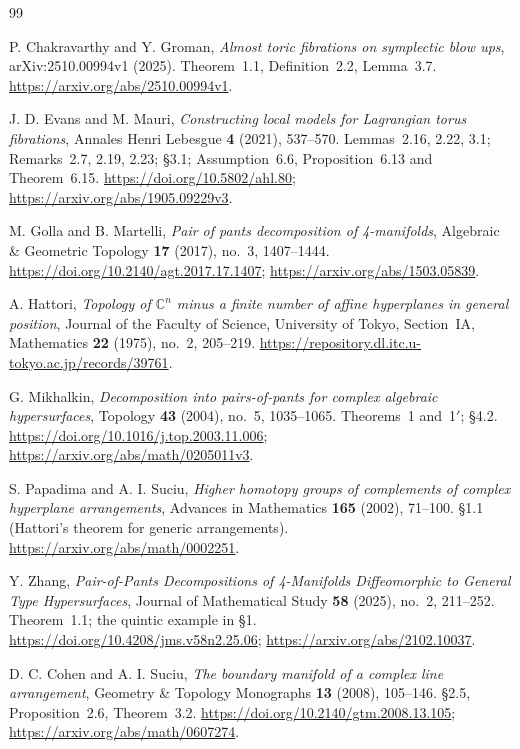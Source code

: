 \begin{thebibliography}{99}

P. Chakravarthy and Y. Groman,
\emph{Almost toric fibrations on symplectic blow ups},
arXiv:2510.00994v1 (2025).
Theorem~1.1, Definition~2.2, Lemma~3.7.
\url{https://arxiv.org/abs/2510.00994v1}.

J. D. Evans and M. Mauri,
\emph{Constructing local models for Lagrangian torus fibrations},
Annales Henri Lebesgue \textbf{4} (2021), 537--570.
Lemmas~2.16, 2.22, 3.1; Remarks~2.7, 2.19, 2.23; \S3.1;
Assumption~6.6, Proposition~6.13 and Theorem~6.15.
\url{https://doi.org/10.5802/ahl.80};
\url{https://arxiv.org/abs/1905.09229v3}.

M. Golla and B. Martelli,
\emph{Pair of pants decomposition of 4-manifolds},
Algebraic \& Geometric Topology \textbf{17} (2017), no.~3, 1407--1444.
\url{https://doi.org/10.2140/agt.2017.17.1407};
\url{https://arxiv.org/abs/1503.05839}.

A. Hattori,
\emph{Topology of $\mathbb C^n$ minus a finite number of affine hyperplanes in general position},
Journal of the Faculty of Science, University of Tokyo, Section~IA, Mathematics
\textbf{22} (1975), no.~2, 205--219.
\url{https://repository.dl.itc.u-tokyo.ac.jp/records/39761}.

G. Mikhalkin,
\emph{Decomposition into pairs-of-pants for complex algebraic hypersurfaces},
Topology \textbf{43} (2004), no.~5, 1035--1065.
Theorems~1 and~1$'$; \S4.2.
\url{https://doi.org/10.1016/j.top.2003.11.006};
\url{https://arxiv.org/abs/math/0205011v3}.

S. Papadima and A. I. Suciu,
\emph{Higher homotopy groups of complements of complex hyperplane arrangements},
Advances in Mathematics \textbf{165} (2002), 71--100.
\S1.1 (Hattori's theorem for generic arrangements).
\url{https://arxiv.org/abs/math/0002251}.

Y. Zhang,
\emph{Pair-of-Pants Decompositions of 4-Manifolds Diffeomorphic to General Type Hypersurfaces},
Journal of Mathematical Study \textbf{58} (2025), no.~2, 211--252.
Theorem~1.1; the quintic example in \S1.
\url{https://doi.org/10.4208/jms.v58n2.25.06};
\url{https://arxiv.org/abs/2102.10037}.

D. C. Cohen and A. I. Suciu,
\emph{The boundary manifold of a complex line arrangement},
Geometry \& Topology Monographs \textbf{13} (2008), 105--146.
\S2.5, Proposition~2.6, Theorem~3.2.
\url{https://doi.org/10.2140/gtm.2008.13.105};
\url{https://arxiv.org/abs/math/0607274}.


\end{thebibliography}
